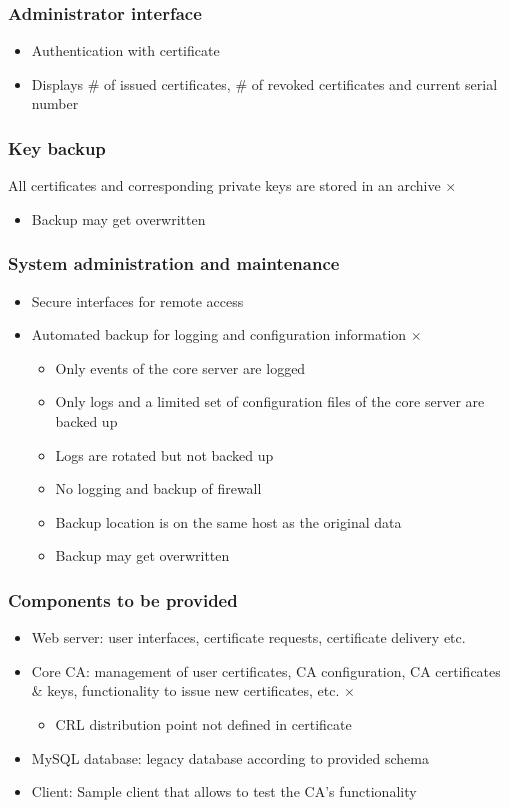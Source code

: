 \documentclass{article}
\begin{document}
\subsubsection{Administrator interface}
\begin{itemize}
\item Authentication with certificate \checkmark
\item Displays \# of issued certificates, \# of revoked certificates and current serial number \checkmark
\end{itemize}
\subsubsection{Key backup}
All certificates and corresponding private keys are stored in an archive $\times$
	\begin{itemize}
	\item Backup may get overwritten
	\end{itemize}

\subsubsection{System administration and maintenance}
\begin{itemize}
\item Secure interfaces for remote access \checkmark
\item Automated backup for logging and configuration information $\times$
	\begin{itemize}
	\item Only events of the core server are logged
	\item Only logs and a limited set of configuration files of the core server are backed up
	\item Logs are rotated but not backed up
	\item No logging and backup of firewall
	\item Backup location is on the same host as the original data
	\item Backup may get overwritten
	\end{itemize}
\end{itemize}
\subsubsection{Components to be provided}
\begin{itemize}
\item Web server: user interfaces, certificate requests, certificate delivery etc. \checkmark
\item Core CA: management of user certificates, CA configuration, CA certificates \& keys, functionality to issue new certificates, etc. $\times$
	\begin{itemize}
	\item CRL distribution point not defined in certificate
	\end{itemize}
\item MySQL database: legacy database according to provided schema \checkmark
\item Client: Sample client that allows to test the CA's functionality \checkmark
\end{itemize}
\end{document}
